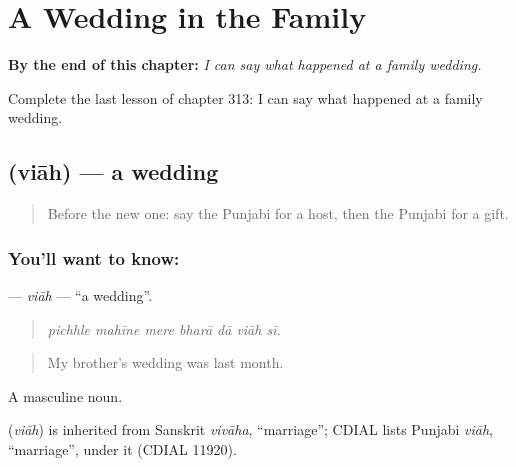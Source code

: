 
\chapter{A Wedding in the Family}
\label{ch:pa-a2-a-wedding-in-the-family}

\begin{chapteropening}
\textbf{By the end of this chapter:} \emph{I can say what happened at a family wedding.}

Complete the last lesson of chapter 313: I can say what happened at a family wedding.
\end{chapteropening}

\section[\texorpdfstring{\pa{ਵਿਆਹ} (viāh)}{ਵਿਆਹ (viāh)}]{ (viāh) — a wedding}

\label{lesson:PA-C313-viah}



\begin{quote}
Before the new one: say the Punjabi for a host, then the Punjabi for a gift.
\end{quote}

\subsection*{You'll want to know: }
\textbf{} — \emph{viāh} — \textquotedblleft{}a wedding\textquotedblright{}.

\begin{quote}
      
\end{quote}

\begin{quote}
\emph{pichhle mahīne mere bharā dā viāh sī.}
\end{quote}

\begin{quote}
My brother's wedding was last month.
\end{quote}

A masculine noun.

\begin{cousinweb}
\textbf{} (\emph{viāh}) is inherited from Sanskrit \emph{vivāha}, \textquotedblleft{}marriage\textquotedblright{}; CDIAL lists Punjabi \emph{viāh}, \textquotedblleft{}marriage\textquotedblright{}, under it (CDIAL 11920).
\end{cousinweb}

